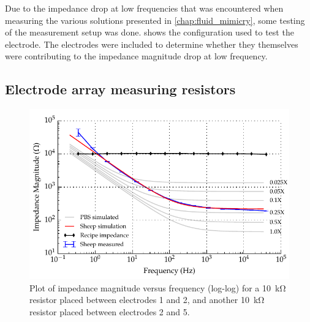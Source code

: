 Due to the impedance drop at low frequencies that was encountered when measuring the various solutions presented in \cref{chap:fluid_mimicry}, some testing of the measurement setup was done.
 shows the configuration used to test the electrode.
The electrodes were included to determine whether they themselves were contributing to the impedance magnitude drop at low frequency.


\subsection{Electrode array measuring resistors}

\begin{figure}
    \centering
    \includegraphics[width=\textwidth]{content/appendices/Solution-Impedance-Measurements/graphics/run14_calibration_10k_noWater_ZVsF_graph_mag}
    \caption{\label{fig:calibration_10kRes_mag}Plot of impedance magnitude versus frequency (log-log) for a \SI{10}{\kilo\ohm} resistor placed between electrodes 1 and 2, and another \SI{10}{\kilo\ohm} resistor placed between electrodes 2 and 5.}
\end{figure}

